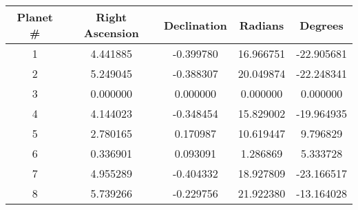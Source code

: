 \documentclass[12pt, leqno]{article}
\begin{document}
\bigskip

\begin{tabular}{|c|c|c|c|c|}
\hline
\textbf{Planet \#} & \textbf{Right Ascension} & \textbf{Declination} & \textbf{Radians} & \textbf{Degrees} \\ \hline
1 & 4.441885 & -0.399780 & 16.966751 & -22.905681 \\ \hline
2 & 5.249045 & -0.388307 & 20.049874 & -22.248341 \\ \hline
3 & 0.000000 & 0.000000 & 0.000000 & 0.000000 \\ \hline
4 & 4.144023 & -0.348454 & 15.829002 & -19.964935 \\ \hline
5 & 2.780165 & 0.170987 & 10.619447 & 9.796829 \\ \hline
6 & 0.336901 & 0.093091 & 1.286869 & 5.333728 \\ \hline
7 & 4.955289 & -0.404332 & 18.927809 & -23.166517 \\ \hline
8 & 5.739266 & -0.229756 & 21.922380 & -13.164028 \\ \hline
\end{tabular}
\end{document}
